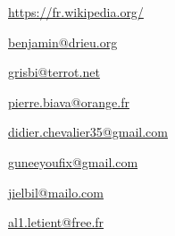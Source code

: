 \urldef{\urlWikipedia}%
\url{https://fr.wikipedia.org/}






\urldef{\urlBenjaminDrieuEmail}%
\url{benjamin@drieu.org}     %



\urldef{\urlFrancoisTerrotEmail}%
\url{grisbi@terrot.net}     %


\urldef{\urlPierreBiavaEmail}%
\url{pierre.biava@orange.fr}     %

\urldef{\urlDidierChevalierEmail}%
\url{didier.chevalier35@gmail.com}     %

\urldef{\urlWilliamOllivierEmail}%
\url{guneeyoufix@gmail.com}     %


\urldef{\urlJeanLucDuflotEmail}%
\url{jielbil@mailo.com}     %

\urldef{\urlAlainLetientEmail}%
\url{al1.letient@free.fr}     %


